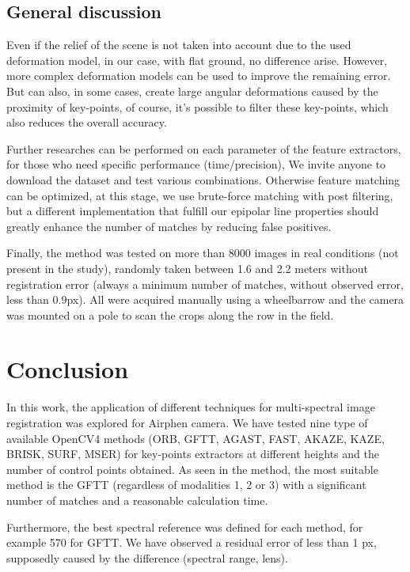 \documentclass[]{elsarticle}
\begin{document}
	\subsection{General discussion}
	
	\par Even if the relief of the scene is not taken into account due to the used deformation model,
	in our case, with flat ground, no difference arise.
	However, more complex deformation models \cite{Lombaert, ThinPlateSpline} can be used to improve the remaining error.
	But can also, in some cases, create large angular deformations caused by the proximity of key-points,
	of course, it's possible to filter these key-points, which also reduces the overall accuracy.
	\\
	\par Further researches can be performed on each parameter of the feature extractors, for those who need specific performance (time/precision),
	We invite anyone to download the dataset and test various combinations.
	Otherwise feature matching can be optimized, at this stage, we use brute-force matching with post filtering,
	but a different implementation that fulfill our epipolar line properties should greatly enhance the number of matches by reducing false positives.
	\\
	\par Finally, the method was tested on more than 8000 images in real conditions (not present in the study),
	randomly taken between 1.6 and 2.2 meters without registration error (always a minimum number of matches, without observed error, less than $0.9$px).
	All were acquired manually using a wheelbarrow and the camera was mounted on a pole to scan the crops along the row in the field.
	
	
	\section{Conclusion}
	
	\par In this work, the application of different techniques for multi-spectral image registration was explored for Airphen camera.
	We have tested nine type of available OpenCV4 methods (ORB, GFTT, AGAST, FAST, AKAZE, KAZE, BRISK, SURF, MSER)
	for key-points extractors at different heights and the number of control points obtained.
	As seen in the method, the most suitable method is the GFTT (regardless of modalities 1, 2 or 3)
	with a significant number of matches and a reasonable calculation time.
	\\
	\par Furthermore, the best spectral reference was defined for each method, for example 570 for GFTT.
	We have observed a residual error of less than 1 px, supposedly caused by the difference (spectral range, lens).
	
\end{document}
